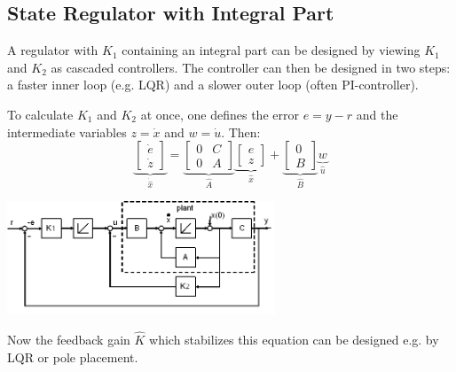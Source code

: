 \subsection{State Regulator with Integral Part}
\begin{minipage}{10cm}
    A regulator with $K_1$ containing an integral part can be designed by
    viewing $K_1$ and $K_2$ as cascaded controllers.
    The controller can then be designed in two steps: a faster inner loop (e.g. LQR)
    and a slower outer loop (often PI-controller).
    
    To calculate $K_1$ and $K_2$ at once, one defines the error $e = y-r$ and the
    intermediate variables $z = \dot{x}$ and $w=\dot{u}$. Then:
    \[
        \underbrace{\begin{bmatrix}
        \dot{e} \\ \dot{z}
        \end{bmatrix}}_{\dot{\hat{x}}}
      = \underbrace{\begin{bmatrix}
            0 & C \\ 0 & A
        \end{bmatrix}}_{\hat{A}}
        \underbrace{\begin{bmatrix}
            e \\ z
        \end{bmatrix}}_{\hat{x}}
      + \underbrace{\begin{bmatrix}
            0 \\ B
        \end{bmatrix}}_{\hat{B}}
        \underbrace{w}_{\hat{u}}
    \]
   
\end{minipage}
\hspace{0.5cm}
\begin{minipage}{8cm}
    \centering
    \includegraphics[width=8cm]{./bilder/statereg_int.png}
\end{minipage}

Now the feedback gain $\hat{K}$ which stabilizes this equation can be designed
e.g. by LQR or pole placement.

